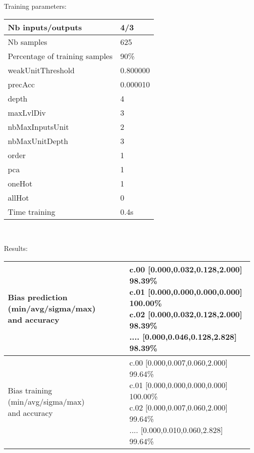Training parameters:\\
\begin{center}
\begin{tabular}{|l|l|}
\hline
Nb inputs/outputs&4/3\\
\hline
Nb samples&625\\
\hline
Percentage of training samples&90\%\\
\hline
weakUnitThreshold&0.800000\\
\hline
precAcc&0.000010\\
\hline
depth&4\\
\hline
maxLvlDiv&3\\
\hline
nbMaxInputsUnit&2\\
\hline
nbMaxUnitDepth&3\\
\hline
order&1\\
\hline
pca&1\\
\hline
oneHot&1\\
\hline
allHot&0\\
\hline
Time training&0.4s\\
\hline
\end{tabular}\\
\end{center}\newline
Results:
\begin{center}
\begin{tabular}{|l|l|}
\hline
\makecell{Bias prediction (min/avg/sigma/max)\\and accuracy}&\makecell{c.00 [0.000,0.032,0.128,2.000] 98.39\%\\
c.01 [0.000,0.000,0.000,0.000] 100.00\%\\
c.02 [0.000,0.032,0.128,2.000] 98.39\%\\
.... [0.000,0.046,0.128,2.828] 98.39\%\\
}\\

\hline
\makecell{Bias training (min/avg/sigma/max)\\and accuracy}&\makecell{c.00 [0.000,0.007,0.060,2.000] 99.64\%\\
c.01 [0.000,0.000,0.000,0.000] 100.00\%\\
c.02 [0.000,0.007,0.060,2.000] 99.64\%\\
.... [0.000,0.010,0.060,2.828] 99.64\%\\
}\\
\hline
\end{tabular}\
\end{center}
